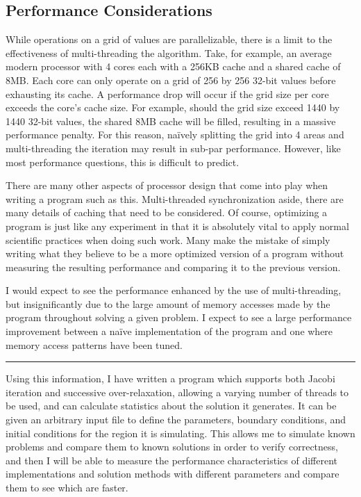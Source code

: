 \subsection{Performance Considerations}
While operations on a grid of values are parallelizable, there is a limit to
the effectiveness of multi-threading the algorithm. Take, for example, an average
modern processor with 4 cores each with a 256KB cache and a shared cache of 8MB\@. Each core
can only operate on a grid of 256 by 256 32-bit values before exhausting its cache.
A performance drop will occur if the grid size per core exceeds the core's cache
size. For example, should the grid size exceed 1440 by 1440 32-bit values,
the shared 8MB cache will
be filled, resulting in a massive performance penalty. For this reason, na\"{i}vely splitting
the grid into 4 areas and multi-threading the iteration may result in sub-par performance.
However, like most performance questions, this is difficult to predict.

There are many other aspects of processor design that come into play when writing a program
such as this. Multi-threaded synchronization aside, there are many details of caching that
need to be considered. Of course, optimizing a program is just like any experiment in that
it is absolutely vital to apply normal scientific practices when doing such work. Many make
the mistake of simply writing what they believe to be a more optimized version of a program
without measuring the resulting performance and comparing it to the previous version.

I would expect to see the performance enhanced by the use of multi-threading, but insignificantly
due to the large amount of memory accesses made by the program throughout solving a given problem.
I expect to see a large performance improvement between a na\"{i}ve implementation of the program
and one where memory access patterns have been tuned.

\begin{center}\rule{2cm}{0.4pt}\end{center}

Using this information, I have written a program which supports both Jacobi iteration and successive over-relaxation,
allowing a varying number of threads to be used, and can calculate statistics about the solution it generates.
It can be given an arbitrary input file to define the parameters, boundary conditions, and initial conditions for
the region it is simulating. This allows me to simulate known problems and compare them to known solutions in order
to verify correctness, and then I will be able
to measure the performance characteristics of different implementations and solution methods with different parameters
and compare them to see which are faster.
